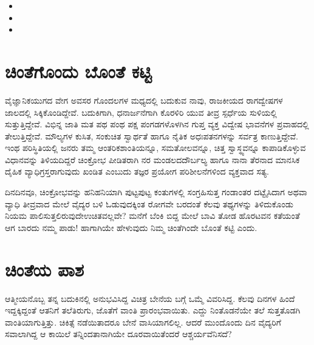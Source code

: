 \begin{itemize}
 \item {}

 \item {}

 \item {}

\end{itemize}


\section*{ಚಿಂತೆಗೊಂದು ಬೊಂತೆ ಕಟ್ಟಿ}

\vskip -6pt

ವೈಜ್ಞಾನಿಕಯುಗದ ವೇಗ ಅವಸರ ಗೊಂದಲಗಳ ಮಧ್ಯದಲ್ಲಿ ಬದುಕುವ ನಾವು, ರಾಜಕೀಯದ ರಾಗದ್ವೇಷಗಳ ಜಾಲದಲ್ಲಿ ಸಿಕ್ಕಿಕೊಂಡಿದ್ದೇವೆ. ಬದುಕಿಗಾಗಿ, ಧನಾರ್ಜನೆಗಾಗಿ ಕೊರಳಿರಿ ಯುವ ತೀವ್ರ ಸ್ಪರ್ಧೆಯ ಸುಳಿಯಲ್ಲಿ ಸುತ್ತುತ್ತಿದ್ದೇವೆ. ವಿಭಿನ್ನ ಜಾತಿ ಮತ ಪಥ ಪಂಥ ಪಕ್ಷ ಪಂಗಡಗ\-ಳೊಳಗಿನ ಗುಪ್ತ ವ್ಯಕ್ತ ವಿದ್ವೇಷ ಭಾವನೆಗಳ ಪ್ರವಾಹದಲ್ಲಿ ತೇಲುತ್ತಿದ್ದೇವೆ. ಮೌಲ್ಯಗಳ ಕುಸಿತ, ಸಂಕುಚಿತ ಸ್ವಾರ್ಥತೆ ಹಾಗೂ ನೈತಿಕ ಅಧಃಪತನಗಳನ್ನು ಸರ್ವತ್ರ ಕಾಣುತ್ತಿದ್ದೇವೆ. ಇಂಥ ಪರಿಸ್ಥಿತಿಯಲ್ಲಿ ಜನರು ತಮ್ಮ ಆಂತರಿಕಶಾಂತಿಯನ್ನೂ, ಸಮತೋಲವನ್ನೂ, ಚಿತ್ತ ಸ್ವಾಸ್ಥ್ಯವನ್ನೂ ಕಾಪಾಡಿಕೊಳ್ಳುವ ವಿಧಾನವನ್ನು ತಿಳಿಯದಿದ್ದರೆ ಚಿಂಕ್ರೋಭ ಪೀಡಿತರಾಗಿ ನರ ಮಂಡಲದ\break ದೌರ್ಬಲ್ಯ ಹಾಗೂ ನಾನಾ ತೆರನಾದ ಮಾನಸಿಕ ದೈಹಿಕ ವ್ಯಾಧಿಗ್ರಸ್ತರಾಗುವುದು ಖಂಡಿತ ಎಂಬುದು ತಜ್ಞರ ಪ್ರಯೋಗ ಪರಿಶೀಲನೆಗಳಿಂದ ವ್ಯಕ್ತವಾದ ಸತ್ಯ.

ದಿನದಿನವೂ, ಚಿಂಕ್ರೋಭವನ್ನು ಹನಿಹನಿಯಾಗಿ ಪುಟ್ಟಪುಟ್ಟ ಕಂತುಗಳಲ್ಲಿ ಸಂಗ್ರಹಿಸುತ್ತ ಗಂಡಾಂತರ ದಟ್ಟೈಸಿದಾಗ ಅಥವಾ ವ್ಯಾಧಿ ತೀವ್ರವಾದ ಮೇಲೆ ವೈದ್ಯರ ಬಳಿ ಓಡುವುದಕ್ಕಿಂತ ರೋಗವೇ ಬರದಂತೆ ಕೆಲವು ತಥ್ಯಗಳನ್ನು ತಿಳಿದುಕೊಂಡು ನಿಯಮ ಪಾಲಿಸುತ್ತಲಿರುವುದೇ\break ಉಚಿತವಲ್ಲವೇ? ಮನೆಗೆ ಬೆಂಕಿ ಬಿದ್ದ ಮೇಲೆ ಬಾವಿ ತೋಡ ಹೊರಟವನ ಕತೆಯಂತೆ ಆಗ ಬಾರದು ನಮ್ಮ ಪಾಡು! ಹಾಗಾಗಿಯೇ ಹೇಳುವುದು ನಿಮ್ಮ ಚಿಂತೆಗಿಂದೇ ಬೊಂತೆ ಕಟ್ಟಿ ಎಂದು.


\section*{ಚಿಂತೆಯ ಪಾಶ}

\vskip -6pt

ಆತ್ಮೀಯನೊಬ್ಬ ತನ್ನ ಬದುಕಿನಲ್ಲಿ ಅನುಭವಿಸಿದ್ದ ವಿಚಿತ್ರ ಬೇನೆಯ ಬಗ್ಗೆ ಒಮ್ಮೆ ವಿವರಿಸಿದ್ದ. ಕೆಲವು ದಿನಗಳ ಹಿಂದೆ ಇದ್ದಕ್ಕಿದ್ದಂತೆ ಆತನಿಗೆ ತಲೆತಿರುಗು, ಜೊತೆಗೆ ವಾಂತಿ ಪ್ರಾರಂಭವಾಯಿತು. ಎದ್ದು ನಿಂತೊಡನೆಯೇ ತಲೆ ಸುತ್ತತೊಡಗಿ ವಾಂತಿಯಾಗುತ್ತಿತ್ತು. ಚಿಕಿತ್ಸೆ ನಡೆಯಿತಾದರೂ ಬೇನೆ ವಾಸಿಯಾಗಲಿಲ್ಲ. ಆದರೆ ಮುಂದೊಂದು ದಿನ ವೈದ್ಯರಿಗೆ ಸವಾಲಾಗಿದ್ದ ಆ ಕಾಯಿಲೆ ತನ್ನಿಂದ\break ತಾನಾಗಿಯೇ ದೂರವಾಯಿತೆಂದರೆ ಆಶ್ಚರ್ಯವೆನಿಸದೆ?

